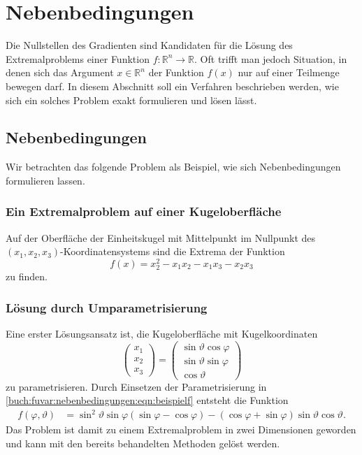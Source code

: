 %
%
%
\section{Nebenbedingungen
\label{buch:fuvar:section:nebenbedingungen}}
Die Nullstellen des Gradienten sind Kandidaten für die Lösung
des Extremalproblems einer Funktion $f\colon\mathbb{R}^n\to\mathbb{R}$.
Oft trifft man jedoch Situation, in denen sich das Argument
$x\in\mathbb{R}^n$ der Funktion $f(x)$ nur auf einer Teilmenge
bewegen darf.
In diesem Abschnitt soll ein Verfahren beschrieben werden, wie sich
ein solches Problem exakt formulieren und lösen lässt.

%
%
\subsection{Nebenbedingungen}
Wir betrachten das folgende Problem als Beispiel, wie sich 
Nebenbedingungen formulieren lassen.

%
%
\subsubsection{Ein Extremalproblem auf einer Kugeloberfläche}
Auf der Oberfläche der Einheitskugel mit Mittelpunkt im Nullpunkt
des $(x_1,x_2,x_3)$-Koor\-di\-na\-ten\-sys\-tems sind die Extrema
der Funktion 
\begin{equation}
f(x)
=
x_2^2
-
x_1x_2
-
x_1x_3
-
x_2x_3
\label{buch:fuvar:nebenbedingungen:eqn:beispielf}
\end{equation}
zu finden.

%
%
\subsubsection{Lösung durch Umparametrisierung}
Eine erster Lösungsansatz ist, die Kugeloberfläche mit Kugelkoordinaten
\[
\begin{pmatrix}
x_1\\
x_2\\
x_3
\end{pmatrix}
=
\begin{pmatrix}
\sin\vartheta\cos\varphi\\
\sin\vartheta\sin\varphi\\
\cos\vartheta
\end{pmatrix}
\]
zu parametrisieren.
Durch Einsetzen der Parametrisierung in
\eqref{buch:fuvar:nebenbedingungen:eqn:beispielf}
entsteht die Funktion
\begin{align*}
f(\varphi,\vartheta)
&=
\sin^2\vartheta
\sin\varphi
(\sin\varphi
-
\cos\varphi)
-
(
\cos\varphi
+
\sin\varphi
)
\sin\vartheta
\cos\vartheta.
\end{align*}
Das Problem ist damit zu einem Extremalproblem in zwei Dimensionen
geworden und kann mit den bereits behandelten Methoden gelöst werden.

